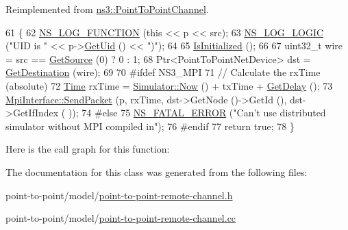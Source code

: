 Reimplemented from \hyperlink{classns3_1_1PointToPointChannel_ad3032b1fa7e3e046ccd0bc7e1b5de80b}{ns3\+::\+Point\+To\+Point\+Channel}.


\begin{DoxyCode}
61 \{
62   \hyperlink{log-macros-disabled_8h_a90b90d5bad1f39cb1b64923ea94c0761}{NS\_LOG\_FUNCTION} (\textcolor{keyword}{this} << p << src);
63   \hyperlink{group__logging_ga88acd260151caf2db9c0fc84997f45ce}{NS\_LOG\_LOGIC} (\textcolor{stringliteral}{"UID is "} << p->\hyperlink{classns3_1_1Packet_a1f212c825b50e54d94f5b9ae99592e6a}{GetUid} () << \textcolor{stringliteral}{")"});
64 
65   \hyperlink{classns3_1_1PointToPointChannel_a6c439809e1b060a0817b4c8878ef7077}{IsInitialized} ();
66 
67   uint32\_t wire = src == \hyperlink{classns3_1_1PointToPointChannel_a4efe45237b67f67d8178a6113d8c5e30}{GetSource} (0) ? 0 : 1;
68   Ptr<PointToPointNetDevice> dst = \hyperlink{classns3_1_1PointToPointChannel_a0fda1bded8c7ccebf97e406deb001e3a}{GetDestination} (wire);
69 
70 \textcolor{preprocessor}{#ifdef NS3\_MPI}
71   \textcolor{comment}{// Calculate the rxTime (absolute)}
72   \hyperlink{namespacens3_1_1TracedValueCallback_a7ffd3e7c142ffe7c8a1d2db9b8de38ec}{Time} rxTime = \hyperlink{classns3_1_1Simulator_ac3178fa975b419f7875e7105be122800}{Simulator::Now} () + txTime + \hyperlink{classns3_1_1PointToPointChannel_a42bc95ef9f6853f310f944233799a6e7}{GetDelay} ();
73   \hyperlink{classns3_1_1MpiInterface_a4e8c1510f211948683038e6ee12e692a}{MpiInterface::SendPacket} (p, rxTime, dst->GetNode ()->GetId (), dst->GetIfIndex (
      ));
74 \textcolor{preprocessor}{#else}
75   \hyperlink{group__fatal_ga5131d5e3f75d7d4cbfd706ac456fdc85}{NS\_FATAL\_ERROR} (\textcolor{stringliteral}{"Can't use distributed simulator without MPI compiled in"});
76 \textcolor{preprocessor}{#endif}
77   \textcolor{keywordflow}{return} \textcolor{keyword}{true};
78 \}
\end{DoxyCode}


Here is the call graph for this function\+:




The documentation for this class was generated from the following files\+:\begin{DoxyCompactItemize}
\item 
point-\/to-\/point/model/\hyperlink{point-to-point-remote-channel_8h}{point-\/to-\/point-\/remote-\/channel.\+h}\item 
point-\/to-\/point/model/\hyperlink{point-to-point-remote-channel_8cc}{point-\/to-\/point-\/remote-\/channel.\+cc}\end{DoxyCompactItemize}
